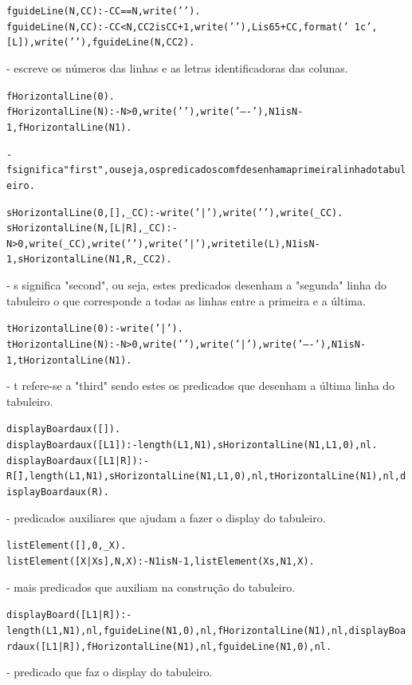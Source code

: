 \documentclass[a4paper]{article}
\begin{document}
\begin{alltt}
	fguideLine(N, CC) :- CC==N, write('    ').
	fguideLine(N, CC) :- CC < N, CC2 is CC+1, write('    '), \newline L is 65+CC, format('~1c', [L]) , write(' '), fguideLine(N, CC2).
\end{alltt}
		\normalfont - escreve os números das linhas e as letras identificadoras das colunas.
\begin{alltt}
	fHorizontalLine(0).
	fHorizontalLine(N) :- N>0 , write('  '), write('----'), N1 is N-1,\newline fHorizontalLine(N1).

		 \normalfont - f significa "first", ou seja, os predicados com f desenham a primeira linha do tabuleiro.
\end{alltt}
\begin{alltt}
	sHorizontalLine(0, [], \_CC) :- write('|'),write(' '), write(\_CC).
	sHorizontalLine(N, [L|R], \_CC) :- N>0 , write(\_CC), write(' '), \newline write('|'), writetile(L), N1 is N-1, sHorizontalLine(N1, R, \_CC2).
\end{alltt}
		\normalfont  - s significa "second", ou seja, estes predicados desenham a "segunda" linha do tabuleiro o que corresponde a todas as linhas entre a primeira e a última.

\begin{alltt}
	tHorizontalLine(0) :-  write('|').
	tHorizontalLine(N) :- N>0, write(' '), write('|'), \newline write('----'), N1 is N-1 , tHorizontalLine(N1).
\end{alltt}
		\normalfont - t refere-se a "third" sendo estes os predicados que desenham a última linha do tabuleiro.

\begin{alltt}
	displayBoardaux([]).
	displayBoardaux([L1]) :- length(L1,N1), sHorizontalLine(N1,L1,0), nl.
	displayBoardaux([L1|R]) :- R \= [], length(L1,N1),  \newline sHorizontalLine(N1, L1,0), nl, tHorizontalLine(N1), nl, displayBoardaux(R).
\end{alltt}
		\normalfont - predicados auxiliares que ajudam a fazer o display do tabuleiro.

\begin{alltt}
	listElement([],0, _X).
	listElement([X|Xs], N, X) :- N1 is N - 1,  listElement(Xs, N1, X).
\end{alltt}
		\normalfont - mais predicados que auxiliam na construção do tabuleiro. 
\begin{alltt}
	displayBoard([L1|R]) :-  length(L1,N1), nl, fguideLine(N1, 0), nl, \newline fHorizontalLine(N1), nl, displayBoardaux([L1|R]), \newline fHorizontalLine(N1), nl, fguideLine(N1, 0), nl.
\end{alltt}
		\normalfont - predicado que faz o display do tabuleiro.
\end{document}
